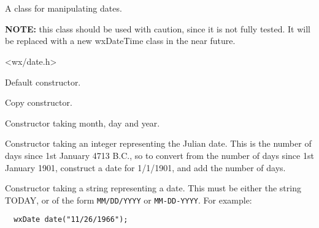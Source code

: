 \section{}\label{wxdate}

A class for manipulating dates.

{\bf NOTE:} this class should be
used with caution, since it is not fully tested. It will be replaced
with a new wxDateTime class in the near future.




<wx/date.h>




\label{wxdateconstr}


Default constructor.


Copy constructor.


Constructor taking month, day and year.


Constructor taking an integer representing the Julian date. This is the number of days since
1st January 4713 B.C., so to convert from the number of days since 1st January 1901,
construct a date for 1/1/1901, and add the number of days.


Constructor taking a string representing a date. This must be either the string TODAY, or of the
form {\tt MM/DD/YYYY} or {\tt MM-DD-YYYY}. For example:

\begin{verbatim}
  wxDate date("11/26/1966");
\end{verbatim}





